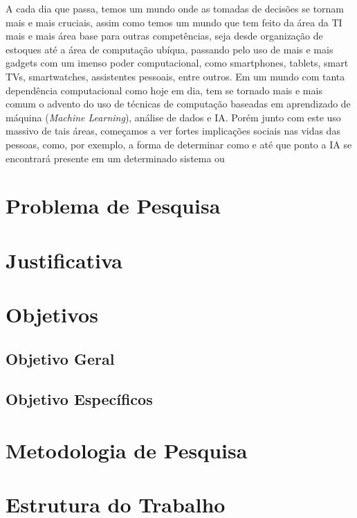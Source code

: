 \label{introducao}


A cada dia que passa, temos um mundo onde as tomadas de decisões se tornam mais e mais cruciais, assim como temos um mundo que tem feito da área da \acrshort{TI} mais e mais área base para outras competências, seja desde organização de estoques até a área de computação ubíqua, passando pelo uso de mais e mais gadgets com um imenso poder computacional, como smartphones, tablets, smart TVs, smartwatches, assistentes pessoais, entre outros. Em um mundo com tanta dependência computacional como hoje em dia, tem se tornado mais e mais comum o advento do uso de técnicas de computação baseadas em aprendizado de máquina (\textit{Machine Learning}), análise de dados e \acrshort{IA}. Porém junto com este uso massivo de tais áreas, começamos a ver fortes implicações sociais nas vidas das pessoas, como, por exemplo, a forma de determinar como e até que ponto a \acrshort{IA} se encontrará presente em um determinado sistema ou  


\section{Problema de Pesquisa}


\section{Justificativa}


\section{Objetivos}


\subsection{Objetivo Geral}


\subsection{Objetivo Específicos}


\section{Metodologia de Pesquisa}


\section{Estrutura do Trabalho}

